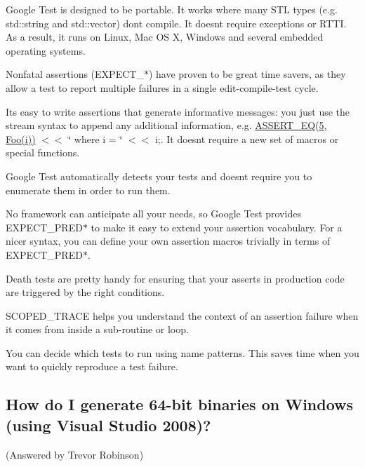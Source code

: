 \begin{DoxyItemize}
\item Google Test is designed to be portable. It works where many S\+TL types (e.\+g. {\ttfamily std\+::string} and {\ttfamily std\+::vector}) don\textquotesingle{}t compile. It doesn\textquotesingle{}t require exceptions or R\+T\+TI. As a result, it runs on Linux, Mac OS X, Windows and several embedded operating systems.
\item Nonfatal assertions ({\ttfamily E\+X\+P\+E\+C\+T\+\_\+$\ast$}) have proven to be great time savers, as they allow a test to report multiple failures in a single edit-\/compile-\/test cycle.
\item It\textquotesingle{}s easy to write assertions that generate informative messages\+: you just use the stream syntax to append any additional information, e.\+g. {\ttfamily \hyperlink{gtest_8h_a1a6db8b1338ee7040329322b77779086}{A\+S\+S\+E\+R\+T\+\_\+\+E\+Q(5, Foo(i))} $<$$<$ \char`\"{} where i = \char`\"{} $<$$<$ i;}. It doesn\textquotesingle{}t require a new set of macros or special functions.
\item Google Test automatically detects your tests and doesn\textquotesingle{}t require you to enumerate them in order to run them.
\item No framework can anticipate all your needs, so Google Test provides {\ttfamily E\+X\+P\+E\+C\+T\+\_\+\+P\+R\+E\+D$\ast$} to make it easy to extend your assertion vocabulary. For a nicer syntax, you can define your own assertion macros trivially in terms of {\ttfamily E\+X\+P\+E\+C\+T\+\_\+\+P\+R\+E\+D$\ast$}.
\item Death tests are pretty handy for ensuring that your asserts in production code are triggered by the right conditions.
\item {\ttfamily S\+C\+O\+P\+E\+D\+\_\+\+T\+R\+A\+CE} helps you understand the context of an assertion failure when it comes from inside a sub-\/routine or loop.
\item You can decide which tests to run using name patterns. This saves time when you want to quickly reproduce a test failure.
\end{DoxyItemize}

\subsection*{How do I generate 64-\/bit binaries on Windows (using Visual Studio 2008)?}

(Answered by Trevor Robinson)

